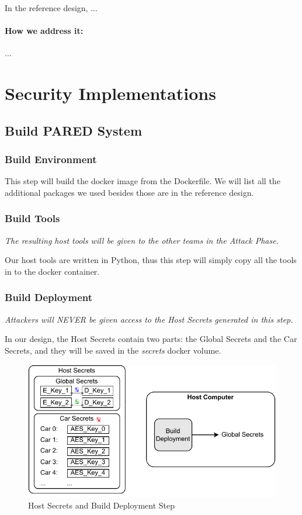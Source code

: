 \documentclass[11pt,oneside,onecolumn,letterpaper]{article}
\begin{document}
In the reference design, ...

\paragraph{How we address it:} ...



\section{Security Implementations}



\subsection{Build PARED System}

\subsubsection{Build Environment}

This step will build the docker image from the Dockerfile. We will list all the additional packages we used besides those are in the reference design.

\subsubsection{Build Tools}

\textit{The resulting host tools will be given to the other teams in the Attack Phase.}

Our host tools are written in Python, thus this step will simply copy all the tools in to the docker container.

\subsubsection{Build Deployment}

\textit{Attackers will NEVER be given access to the Host Secrets generated in this step.}

In our design, the Host Secrets contain two parts: the Global Secrets and the Car Secrets, and they will be saved in the \textit{secrets} docker volume.

\begin{figure}[!htbp]
	\begin{centering}
		\includegraphics[width = .6\textwidth]{pic/build_depl.pdf}
		\caption{Host Secrets and Build Deployment Step}
		\label{fig:build_depl}
	\end{centering}
\end{figure}
\end{document}
